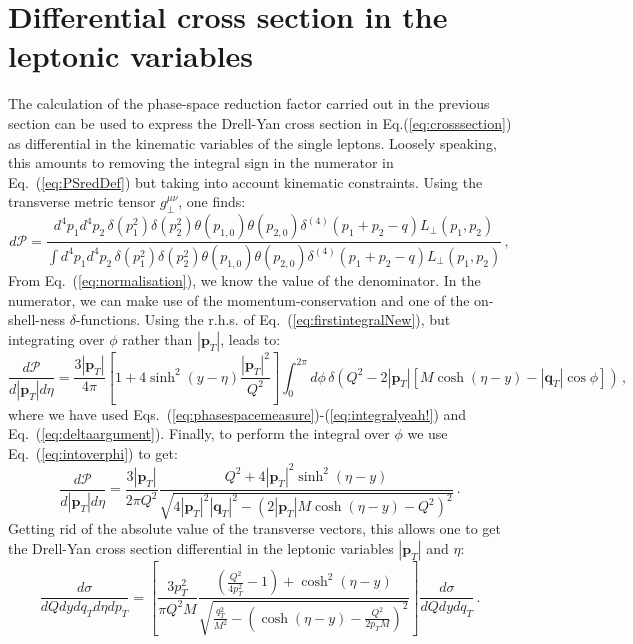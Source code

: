 \documentclass[10pt,a4paper]{article}
\begin{document}
\section{Differential cross section in the leptonic variables}

The calculation of the phase-space reduction factor carried out in the
previous section can be used to express the Drell-Yan cross section in
Eq.(\ref{eq:crosssection}) as differential in the kinematic variables
of the single leptons. Loosely speaking, this amounts to removing the
integral sign in the numerator in Eq.~(\ref{eq:PSredDef}) but taking
into account kinematic constraints. Using the transverse metric tensor
$g_\perp^{\mu\nu}$, one finds:
\begin{equation}
d\mathcal{P} = \frac{\displaystyle d^4p_1 d^4p_2 \,\delta(p_1^2) \delta(p_2^2)\theta(p_{1,0}) \theta(p_{2,0})\delta^{(4)}(p_1+p_2-q) L_\perp(p_1,p_2)}{\displaystyle \int d^4p_1 d^4p_2\, \delta(p_1^2) \delta(p_2^2) \theta(p_{1,0}) \theta(p_{2,0})\delta^{(4)}(p_1+p_2-q) L_\perp(p_1,p_2)}\,,
\end{equation}
From Eq.~(\ref{eq:normalisation}), we know the value of the
denominator. In the numerator, we can make use of the
momentum-conservation and one of the on-shell-ness
$\delta$-functions. Using the r.h.s. of
Eq.~(\ref{eq:firstintegralNew}), but integrating over $\phi$ rather
than $|\mathbf{p}_T|$, leads to:
\begin{equation}
\frac{d\mathcal{P}}{d|\mathbf{p}_T|d\eta} = \frac {3 |\mathbf{p}_T|}{4\pi}\left[1+4 \sinh^2(y-\eta)\frac{|\mathbf{p}_T|^2}{Q^2}\right]
 \int_0^{2\pi} d\phi\,\delta(Q^2-2 |\mathbf{p}_T|\left[M\cosh\left(\eta - y\right)-|\mathbf{q}_T|\cos\phi\right])\,,
\end{equation}
where we have used
Eqs.~(\ref{eq:phasespacemeasure})-(\ref{eq:integralyeah!}) and
Eq.~(\ref{eq:deltaargument}). Finally, to perform the integral over
$\phi$ we use Eq.~(\ref{eq:intoverphi}) to get:
\begin{equation}
\frac{d\mathcal{P}}{d|\mathbf{p}_T|d\eta} = \frac {3|\mathbf{p}_T|}{2\pi Q^2}
 \frac{Q^2+4 |\mathbf{p}_T|^2 \sinh^2(\eta-y)}{\sqrt{4|\mathbf{p}_T|^2|\mathbf{q}_T|^2-(2|\mathbf{p}_T|M\cosh(\eta-y)-Q^2)^2}}\,.
\end{equation}
Getting rid of the absolute value of the transverse vectors, this
allows one to get the Drell-Yan cross section differential in the
leptonic variables $|\mathbf{p}_T|$ and $\eta$:
\begin{equation}
\frac{d\sigma}{dQ dy dq_T d\eta dp_T} =
                                                          \left[\frac
                                                          {3p_T^2}{\pi
                                                          Q^2 M}\frac{\left(\frac{Q^2}{4 p_T^2}-1\right)+\cosh^2(\eta-y)}{\sqrt{\frac{q_T^2}{M^2}-\left(\cosh(\eta-y)-\frac{Q^2}{2p_TM}\right)^2}}\right]\frac{d\sigma}{dQ dy dq_T}\,.
\end{equation}
\end{document}
